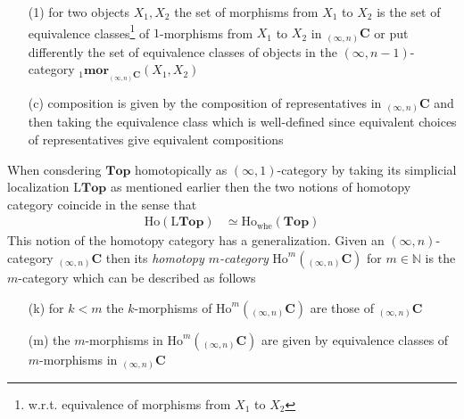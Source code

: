 \begin{itemize}
\begin{enumerate}
\item[(1)]
for two objects $X_{1},X_{2}$ the set of morphisms from $X_{1}$ to $X_{2}$ is the set of equivalence classes\footnote{w.r.t. equivalence of morphisms from $X_{1}$ to $X_{2}$} of $1$-morphisms from $X_{1}$ to $X_{2}$ in ${_{(\infty,n)}}\mathbf{C}$ or put differently the set of equivalence classes of objects in the $(\infty,n-1)$-category ${_{1}}\mathbf{mor}_{{_{(\infty,n)}}\mathbf{C}}(X_{1},X_{2})$

\item[(c)]
composition is given by the composition of representatives in ${_{(\infty,n)}}\mathbf{C}$ and then taking the equivalence class which is well-defined since equivalent choices of representatives give equivalent compositions
\end{enumerate}
When consdering $\mathbf{Top}$ homotopically as $(\infty,1)$-category by taking its simplicial localization $\mathrm{L}\mathbf{Top}$ as mentioned earlier then the two notions of homotopy category coincide in the sense that
\begin{align*}
  \mathrm{Ho}(\mathrm{L}\mathbf{Top})
  &\simeq
  \mathrm{Ho}_{\mathrm{whe}}(\mathbf{Top})
\end{align*}
This notion of the homotopy category has a generalization. Given an $(\infty,n)$-category ${_{(\infty,n)}}\mathbf{C}$ then its \textit{homotopy $m$-category} $\mathrm{Ho}^{m}({_{(\infty,n)}}\mathbf{C})$ for $m \in \mathbb{N}$ is the $m$-category which can be described as follows
\begin{enumerate}
\item[(k)]
for $k < m$ the $k$-morphisms of $\mathrm{Ho}^{m}({_{(\infty,n)}}\mathbf{C})$ are those of ${_{(\infty,n)}}\mathbf{C}$

\item[(m)]
the $m$-morphisms in $\mathrm{Ho}^{m}({_{(\infty,n)}}\mathbf{C})$ are given by equivalence classes of $m$-morphisms in ${_{(\infty,n)}}\mathbf{C}$


\end{enumerate}
\end{itemize}
